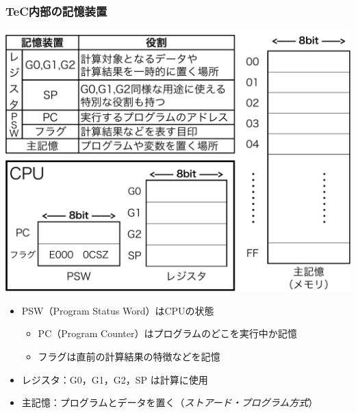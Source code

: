 \documentclass[handout]{beamer}        %
\begin{document}
\begin{frame}
  \frametitle{TeC内部の記憶装置}
  \vfill
  \centerline{\includegraphics[scale=0.2]{../Keynote/naibu-crop.pdf}}
  \vfill
  \begin{itemize}
    \item PSW（Program Status Word）はCPUの状態
      \begin{itemize}
         \item PC（Program Counter）はプログラムのどこを実行中か記憶
         \item フラグは直前の計算結果の特徴などを記憶
      \end{itemize}
    \item レジスタ：G0，G1，G2，SP は計算に使用
    \item 主記憶：プログラムとデータを置く（\emph{ストアード・プログラム方式}）
  \end{itemize}
  \vfill
\end{frame}
\end{document}
